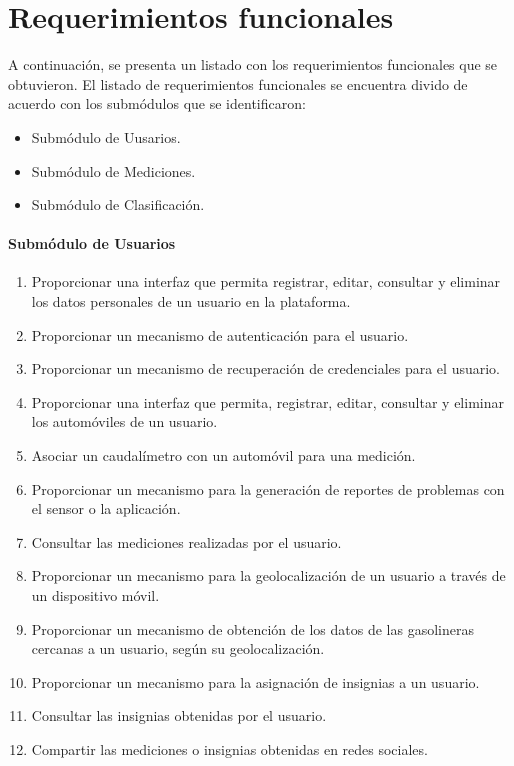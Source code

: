 \section{Requerimientos funcionales}
A continuación, se presenta un listado con los requerimientos funcionales que se obtuvieron.
El listado de requerimientos funcionales se encuentra divido de acuerdo con los submódulos que se identificaron:
\begin{itemize}
	\item Submódulo de Uusarios.
	\item Submódulo de Mediciones.
	\item Submódulo de Clasificación.
\end{itemize}

\paragraph{Submódulo de Usuarios}
\begin{enumerate}[label=RF\arabic*.]
	\item Proporcionar una interfaz que permita registrar, editar, consultar y eliminar los datos personales de un usuario en la plataforma.
	\item Proporcionar un mecanismo de autenticación para el usuario.
	\item Proporcionar un mecanismo de recuperación de credenciales para el usuario.
	\item Proporcionar una interfaz que permita, registrar, editar, consultar y eliminar los automóviles de un usuario.
	\item Asociar un caudalímetro con un automóvil para una medición.
	\item Proporcionar un mecanismo para la generación de reportes de problemas con el sensor o la aplicación.
	\item Consultar las mediciones realizadas por el usuario.
	\item Proporcionar un mecanismo para la geolocalización de un usuario a través de un dispositivo móvil.
	\item Proporcionar un mecanismo de obtención de los datos de las gasolineras cercanas a un usuario, según su geolocalización.
	\item Proporcionar un mecanismo para la asignación de insignias a un usuario.
	\item Consultar las insignias obtenidas por el usuario.
	\item Compartir las mediciones o insignias obtenidas en redes sociales.
\end{enumerate}


